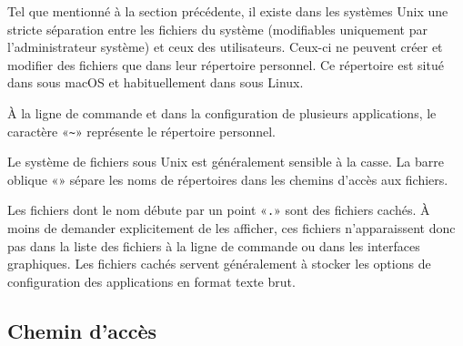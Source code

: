 Tel que mentionné à la section précédente, il existe dans les systèmes
Unix une stricte séparation entre les fichiers du système (modifiables
uniquement par l'administrateur système) et ceux des utilisateurs. Ceux-ci ne
peuvent créer et modifier des fichiers que dans leur répertoire personnel. Ce répertoire
est situé dans  sous macOS et habituellement dans
 sous Linux.

À la ligne de commande et dans la configuration de plusieurs
applications, le caractère %
«\verb=~=» %
représente le répertoire personnel.

Le système de fichiers sous Unix est généralement sensible à la casse.
La barre oblique «\code{/}» sépare les noms de répertoires dans les
chemins d'accès aux fichiers.

Les fichiers dont le nom débute par un point «\verb=.=» sont des
fichiers cachés. À moins de demander explicitement de les afficher,
ces fichiers n'apparaissent donc pas dans la liste des fichiers à la
ligne de commande ou dans les interfaces graphiques. Les fichiers
cachés servent généralement à stocker les options de configuration des
applications en format texte brut.



\subsection{Chemin d'accès}
\label{sec:informatique:fs:path}

